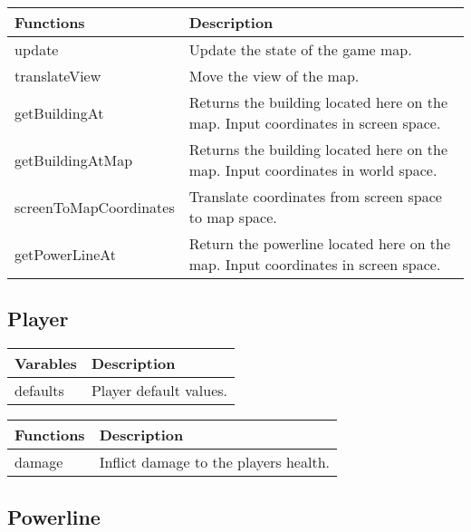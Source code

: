 	
	\begin{table}[H]
	\begin{tabular}{p{4cm} | p{8cm} }
	\hline
	\rowcolor{gray}
	Functions & Description \\ \hline
	update & Update the state of the game map. \\ \hline
	translateView & Move the view of the map. \\ \hline
	getBuildingAt & Returns the building located here on the map. Input coordinates in screen space. \\ \hline
	getBuildingAtMap & Returns the building located here on the map. Input coordinates in world space. \\ \hline
	screenToMapCoordinates & Translate coordinates from screen space to map space. \\ \hline
	getPowerLineAt & Return the powerline located here on the map. Input coordinates in screen space. \\ \hline
	\end{tabular}
	\end{table}

\clearpage

\subsection*{Player}

	\begin{table}[H]
	\begin{tabular}{p{4cm} | p{8cm} }
	\hline
	\rowcolor{gray}
	Varables & Description \\ \hline
	defaults & Player default values. \\ \hline
	\end{tabular}
	\end{table}

	\begin{table}[H]
	\begin{tabular}{p{4cm} | p{8cm} }
	\hline
	\rowcolor{gray}
	Functions & Description \\ \hline
	damage & Inflict damage to the players health. \\ \hline
	\end{tabular}
	\end{table}
	

\subsection*{Powerline}

